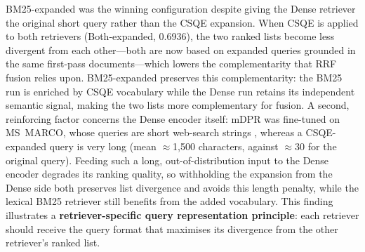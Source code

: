 \begin{table}[htbp]
    \centering
    \caption[CSQE application strategies in hybrid fusion]{Results for three CSQE application strategies in hybrid fusion. BM25-expanded: BM25 receives CSQE query, Dense receives original query. Dense-expanded: BM25 receives original query, Dense receives CSQE query. Both-expanded: both retrievers receive CSQE query.}
    \label{tab:csqe_hybrid_configs}
\end{table}

BM25-expanded was the winning configuration despite giving the Dense retriever the original short query rather than the CSQE expansion. When CSQE is applied to both retrievers (Both-expanded, 0.6936), the two ranked lists become less divergent from each other---both are now based on expanded queries grounded in the same first-pass documents---which lowers the complementarity that RRF fusion relies upon. BM25-expanded preserves this complementarity: the BM25 run is enriched by CSQE vocabulary while the Dense run retains its independent semantic signal, making the two lists more complementary for fusion. A second, reinforcing factor concerns the Dense encoder itself: mDPR was fine-tuned on MS~MARCO, whose queries are short web-search strings \cite{bajaj_2016_msmarco}, whereas a CSQE-expanded query is very long (mean $\approx$1{,}500 characters, against $\approx$30 for the original query). Feeding such a long, out-of-distribution input to the Dense encoder degrades its ranking quality, so withholding the expansion from the Dense side both preserves list divergence and avoids this length penalty, while the lexical BM25 retriever still benefits from the added vocabulary. This finding illustrates a \textbf{retriever-specific query representation principle}: each retriever should receive the query format that maximises its divergence from the other retriever's ranked list.

